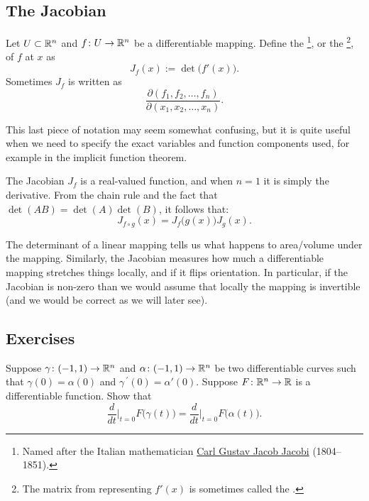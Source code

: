 \subsection{The Jacobian}

\begin{defn}
Let $U \subset {\mathbb{R}}^n$ and
$f \colon U \to {\mathbb{R}}^n$ be a differentiable mapping.  Define the
\emph{}%
\footnote{Named after the Italian mathematician
\href{https://en.wikipedia.org/wiki/Carl_Gustav_Jacob_Jacobi}{Carl Gustav Jacob Jacobi}
(1804--1851).},
or the
\emph{}%
\footnote{The matrix from  representing $f'(x)$
is sometimes called the
\emph{}.},
of $f$ at $x$ as
\begin{equation*}
J_f(x) := \det\bigl( f'(x) \bigr) .
\end{equation*}
Sometimes $J_f$ is written as
\begin{equation*}
\frac{\partial(f_1,f_2,\ldots,f_n)}{\partial(x_1,x_2,\ldots,x_n)} .
\end{equation*}
\end{defn}

This last piece of notation may seem somewhat confusing,
but it is quite useful when we need to specify
the exact variables and function components used,
for example in the implicit function theorem.

The Jacobian $J_f$ is a real-valued function, and when $n=1$ it is simply the
derivative.
From the chain rule and the fact that $\det(AB) = \det(A)\det(B)$, it follows that:
\begin{equation*}
J_{f \circ g} (x) = J_f\bigl(g(x)\bigr) J_g(x) .
\end{equation*}

The determinant of a linear mapping tells us what happens to
area/volume under the mapping.
Similarly, the Jacobian measures how much a differentiable mapping stretches
things locally, and if it flips orientation.  In particular, if the Jacobian
is non-zero than we would assume that locally the mapping is invertible (and
we would be correct as we will later see).

\subsection{Exercises}

\begin{exercise}
Suppose $\gamma \colon (-1,1) \to {\mathbb{R}}^n$ and
$\alpha \colon (-1,1) \to {\mathbb{R}}^n$ be two differentiable curves
such that $\gamma(0) = \alpha(0)$ and $\gamma^{\:\prime}(0) = \alpha'(0)$.
Suppose $F \colon {\mathbb{R}}^n \to {\mathbb{R}}$ is a differentiable function.  Show that
\begin{equation*}
\frac{d}{dt}\Big|_{t=0}
F\bigl(\gamma(t)\bigr)
=
\frac{d}{dt}\Big|_{t=0}
F\bigl(\alpha(t)\bigr)
.
\end{equation*}
\end{exercise}

